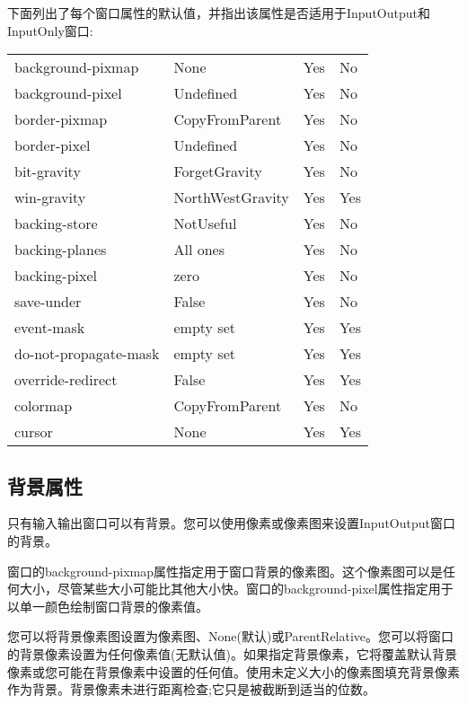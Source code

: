\noindent 下面列出了每个窗口属性的默认值，并指出该属性是否适用于InputOutput和InputOnly窗口:

\begin{center}
	\begin{supertabular}{|l|l|l|l|}
		background-pixmap & None & Yes & No \\
		background-pixel & Undefined & Yes & No \\
		border-pixmap & CopyFromParent & Yes & No \\
		border-pixel & Undefined & Yes & No \\
		bit-gravity & ForgetGravity & Yes & No \\
		win-gravity & NorthWestGravity & Yes & Yes \\
		backing-store & NotUseful & Yes & No \\
		backing-planes & All ones & Yes & No \\
		backing-pixel & zero & Yes & No \\
		save-under & False & Yes & No \\
		event-mask & empty set & Yes & Yes \\
		do-not-propagate-mask & empty set & Yes & Yes \\
		override-redirect & False & Yes & Yes \\
		colormap & CopyFromParent & Yes & No \\
		cursor & None & Yes & Yes \\
		\hline
	\end{supertabular}
\end{center}

\subsection{背景属性}

只有输入输出窗口可以有背景。您可以使用像素或像素图来设置InputOutput窗口的背景。

窗口的background-pixmap属性指定用于窗口背景的像素图。这个像素图可以是任何大小，尽管某些大小可能比其他大小快。窗口的background-pixel属性指定用于以单一颜色绘制窗口背景的像素值。

您可以将背景像素图设置为像素图、None(默认)或ParentRelative。您可以将窗口的背景像素设置为任何像素值(无默认值)。如果指定背景像素，它将覆盖默认背景像素或您可能在背景像素中设置的任何值。使用未定义大小的像素图填充背景像素作为背景。背景像素未进行距离检查;它只是被截断到适当的位数。

